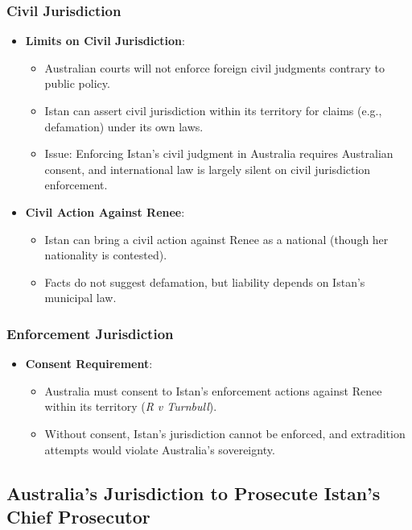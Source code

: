 \subsubsection{Civil Jurisdiction}
\begin{itemize}
    \item \textbf{Limits on Civil Jurisdiction}:
    \begin{itemize}
        \item Australian courts will not enforce foreign civil judgments contrary to public policy.
        \item Istan can assert civil jurisdiction within its territory for claims (e.g., defamation) under its own laws.
        \item Issue: Enforcing Istan’s civil judgment in Australia requires Australian consent, and international law is largely silent on civil jurisdiction enforcement.
    \end{itemize}
    \item \textbf{Civil Action Against Renee}:
    \begin{itemize}
        \item Istan can bring a civil action against Renee as a national (though her nationality is contested).
        \item Facts do not suggest defamation, but liability depends on Istan’s municipal law.
    \end{itemize}
\end{itemize}

\subsubsection{Enforcement Jurisdiction}
\begin{itemize}
    \item \textbf{Consent Requirement}:
    \begin{itemize}
        \item Australia must consent to Istan’s enforcement actions against Renee within its territory (\textit{R v Turnbull}).
        \item Without consent, Istan’s jurisdiction cannot be enforced, and extradition attempts would violate Australia’s sovereignty.
    \end{itemize}
\end{itemize}

\subsection{Australia’s Jurisdiction to Prosecute Istan’s Chief Prosecutor}

